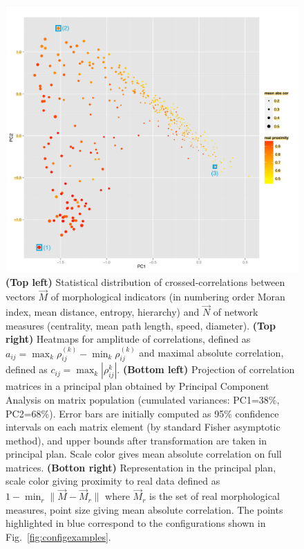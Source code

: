 \documentclass{bmcart}
\newcommand{\norm}[1]{\| #1 \|}
\begin{document}
\begin{figure}[h!]
\begin{minipage}{0.45\linewidth}
\includegraphics[width=\textwidth]{figures/pca_realDistCol_meanAbsCorSize_withSpecificPoints}
\end{minipage}
\caption{ \textbf{(Top left)} Statistical distribution of crossed-correlations between vectors $\vec{M}$ of morphological indicators (in numbering order Moran index, mean distance, entropy, hierarchy) and $\vec{N}$ of network measures (centrality, mean path length, speed, diameter). \textbf{(Top right)} Heatmaps for amplitude of correlations, defined as $a_{ij}=\max_k{\rho_{ij}^{(k)}}-\min_k{\rho_{ij}^{(k)}}$ and maximal absolute correlation, defined as $c_{ij}=\max_k\left| \rho_{ij}^{k} \right|$. \textbf{(Bottom left)} Projection of correlation matrices in a principal plan obtained by Principal Component Analysis on matrix population (cumulated variances: PC1=38\%, PC2=68\%). Error bars are initially computed as 95\% confidence intervals on each matrix element (by standard Fisher asymptotic method), and upper bounds after transformation are taken in principal plan. Scale color gives mean absolute correlation on full matrices. \textbf{(Botton right)} Representation in the principal plan, scale color giving proximity to real data defined as $1 - \min_r \norm{\vec{M}-\vec{M}_r}$ where $\vec{M}_r$ is the set of real morphological measures, point size giving mean absolute correlation. The points highlighted in blue correspond to the configurations shown in Fig.~\ref{fig:configexamples}.\label{fig:densnwcor}}
\end{figure}
\end{document}

